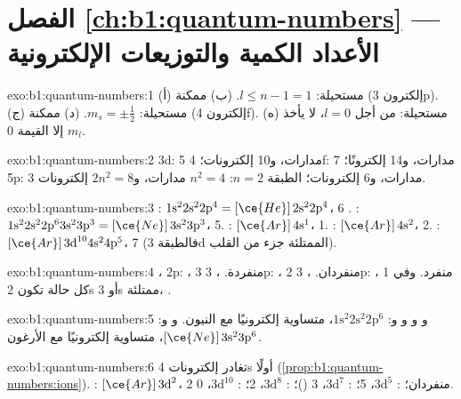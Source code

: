 \section*{الفصل \ref{ch:b1:quantum-numbers} --- الأعداد الكمية والتوزيعات الإلكترونية}

\begin{solution}{exo:b1:quantum-numbers:1}
(أ) مستحيلة: $l \le n - 1 = 1$. (ب) ممكنة (إلكترون 3p).
(ج) مستحيلة: $m_s = \pm\tfrac12$. (د) ممكنة (إلكترون 4f).
(ه) مستحيلة: من أجل $l = 0$، لا يأخذ $m_l$ إلا القيمة 0.
\end{solution}

\begin{solution}{exo:b1:quantum-numbers:2}
3d: 5 مدارات، و10 إلكترونات؛ 4f: 7 مدارات، و14 إلكترونًا؛ 5p: 3
مدارات، و6 إلكترونات؛ الطبقة $n = 2$: $n^2 = 4$ مدارات، و$2n^2 = 8$
إلكترونات.
\end{solution}

\begin{solution}{exo:b1:quantum-numbers:3}
: $1\text{s}^2 2\text{s}^2 2\text{p}^4 = [\ce{He}]\,2\text{s}^2 2\text{p}^4$،
6 . : $1\text{s}^2 2\text{s}^2 2\text{p}^6 3\text{s}^2
3\text{p}^3 = [\ce{Ne}]\,3\text{s}^2 3\text{p}^3$، 5. : $[\ce{Ar}]\,4\text{s}^1$،
1. : $[\ce{Ar}]\,4\text{s}^2$، 2. : $[\ce{Ar}]\,3\text{d}^{10}
4\text{s}^2 4\text{p}^5$، 7 (فالطبقة 3d الممتلئة جزء من القلب).
\end{solution}

\begin{solution}{exo:b1:quantum-numbers:4}
، 2p: ، 3 منفردة. ، 3p: ، 2
منفردان. ، 3p: ، 1 منفرد. وفي كل حالة تكون 2s أو
3s ممتلئة، .
\end{solution}

\begin{solution}{exo:b1:quantum-numbers:5}
 و و و و: $1\text{s}^2
2\text{s}^2 2\text{p}^6$، متساوية إلكترونيًا مع النيون.  و
و: $[\ce{Ne}]\,3\text{s}^2 3\text{p}^6$، متساوية إلكترونيًا مع
الأرغون.
\end{solution}

\begin{solution}{exo:b1:quantum-numbers:6}
تغادر إلكترونات 4s أولًا (\cref{prop:b1:quantum-numbers:ions}).
: $[\ce{Ar}]\,3\text{d}^2$، 2 منفردان؛ :
$3\text{d}^5$، 5؛ : $3\text{d}^7$، 3 ()؛
: $3\text{d}^8$، 2؛ : $3\text{d}^{10}$، 0.
\end{solution}

